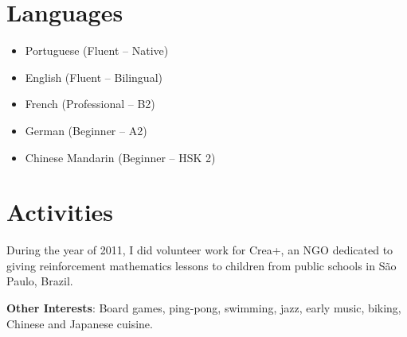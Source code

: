 \documentclass[12pt]{article}
\newcommand{\thesectionicon}{}
\newcommand{\sectionicon}[1]{\renewcommand{\thesectionicon}{#1}}
\begin{document}
\sectionicon{\faLanguage}
\section{Languages}

\begin{minipage}[t]{0.45\textwidth}
\begin{itemize}
\setlength{\itemsep}{0pt}
\item Portuguese (Fluent – Native)
\item English (Fluent – Bilingual)
\item French (Professional – B2)
\end{itemize}
\end{minipage}
\begin{minipage}[t]{0.55\textwidth}
\begin{itemize}
\setlength{\itemsep}{0pt}
\item German (Beginner – A2)
\item Chinese Mandarin (Beginner – HSK 2)
\end{itemize}
\hfill
\end{minipage}

\sectionicon{\faRunning}
\section{Activities}

During the year of 2011, I did volunteer work for Crea+, an NGO dedicated to giving reinforcement mathematics lessons to children from public schools in São Paulo, Brazil.

\smallskip
\textbf{Other Interests}: Board games, ping-pong, swimming, jazz, early music, biking, Chinese and Japanese cuisine.
\end{document}
